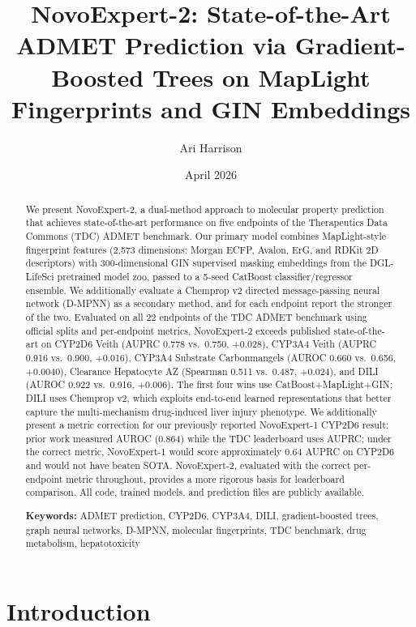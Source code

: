 \documentclass[11pt]{article}
\title{NovoExpert-2: State-of-the-Art ADMET Prediction via Gradient-Boosted Trees on MapLight Fingerprints and {GIN} Embeddings}
\author[1]{Ari Harrison}
\affil[1]{NovoQuant Nexus, San Francisco, CA, USA}
\date{April 2026}
\begin{document}
\maketitle

\begin{abstract}
We present NovoExpert-2, a dual-method approach to molecular property prediction that achieves state-of-the-art performance on five endpoints of the Therapeutics Data Commons (TDC) ADMET benchmark. Our primary model combines MapLight-style fingerprint features (2{,}573 dimensions: Morgan ECFP, Avalon, ErG, and RDKit 2D descriptors) with 300-dimensional GIN supervised masking embeddings from the DGL-LifeSci pretrained model zoo, passed to a 5-seed CatBoost classifier/regressor ensemble. We additionally evaluate a Chemprop v2 directed message-passing neural network (D-MPNN) as a secondary method, and for each endpoint report the stronger of the two. Evaluated on all 22 endpoints of the TDC ADMET benchmark using official splits and per-endpoint metrics, NovoExpert-2 exceeds published state-of-the-art on CYP2D6 Veith (AUPRC 0.778 vs.\ 0.750, $+$0.028), CYP3A4 Veith (AUPRC 0.916 vs.\ 0.900, $+$0.016), CYP3A4 Substrate Carbonmangels (AUROC 0.660 vs.\ 0.656, $+$0.0040), Clearance Hepatocyte AZ (Spearman 0.511 vs.\ 0.487, $+$0.024), and DILI (AUROC 0.922 vs.\ 0.916, $+$0.006). The first four wins use CatBoost+MapLight+GIN; DILI uses Chemprop v2, which exploits end-to-end learned representations that better capture the multi-mechanism drug-induced liver injury phenotype. We additionally present a metric correction for our previously reported NovoExpert-1 CYP2D6 result: prior work measured AUROC (0.864) while the TDC leaderboard uses AUPRC; under the correct metric, NovoExpert-1 would score approximately 0.64 AUPRC on CYP2D6 and would not have beaten SOTA. NovoExpert-2, evaluated with the correct per-endpoint metric throughout, provides a more rigorous basis for leaderboard comparison. All code, trained models, and prediction files are publicly available.

\medskip
\noindent\textbf{Keywords:} ADMET prediction, CYP2D6, CYP3A4, DILI, gradient-boosted trees, graph neural networks, D-MPNN, molecular fingerprints, TDC benchmark, drug metabolism, hepatotoxicity
\end{abstract}

\section{Introduction}
\end{document}
